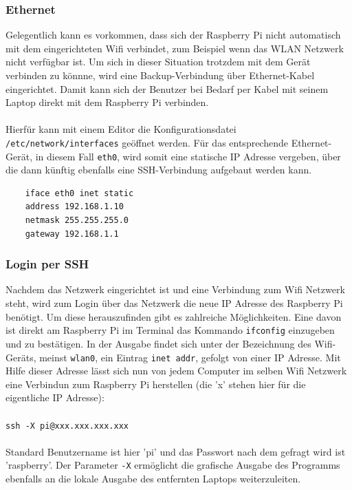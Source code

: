   \subsubsection{Ethernet}
    Gelegentlich kann es vorkommen, dass sich der Raspberry Pi nicht automatisch
    mit dem eingerichteten Wifi verbindet, zum Beispiel wenn das WLAN Netzwerk
    nicht verfügbar ist. Um sich in dieser Situation trotzdem mit dem Gerät
    verbinden zu könnne, wird eine Backup-Verbindung über Ethernet-Kabel
    eingerichtet. Damit kann sich der Benutzer bei Bedarf per Kabel mit seinem
    Laptop direkt mit dem Raspberry Pi verbinden. \\
    \ \\
    Hierfür kann mit einem Editor die Konfigurationsdatei
    \texttt{/etc/network/interfaces} geöffnet werden. Für das entsprechende
    Ethernet-Gerät, in diesem Fall \texttt{eth0}, wird somit eine statische IP
    Adresse vergeben, über die dann künftig ebenfalls eine SSH-Verbindung
    aufgebaut werden kann.

    \begin{lstlisting}
    iface eth0 inet static
    address 192.168.1.10
    netmask 255.255.255.0
    gateway 192.168.1.1
    \end{lstlisting}
    \vspace{0.5cm}

  \subsubsection{Login per SSH}
    Nachdem das Netzwerk eingerichtet ist und eine Verbindung zum Wifi Netzwerk
    steht, wird zum Login über das Netzwerk die neue IP Adresse des Raspberry Pi
    benötigt. Um diese herauszufinden gibt es zahlreiche Möglichkeiten. Eine
    davon ist direkt am Raspberry Pi im Terminal das Kommando \texttt{ifconfig}
    einzugeben und zu bestätigen. In der Ausgabe findet sich unter der
    Bezeichnung des Wifi-Geräts, meinst \texttt{wlan0}, ein Eintrag \texttt{inet
    addr}, gefolgt von einer IP Adresse. Mit Hilfe dieser Adresse lässt
    sich nun von jedem Computer im selben Wifi Netzwerk eine Verbindun zum
    Raspberry Pi herstellen (die 'x' stehen hier für die eigentliche IP Adresse): \\
    \ \\
    \texttt{ssh -X pi@xxx.xxx.xxx.xxx} \\
    \ \\
    Standard Benutzername ist hier 'pi' und das Passwort nach dem gefragt wird
    ist 'raspberry'. Der Parameter \texttt{-X} ermöglicht die grafische Ausgabe
    des Programms ebenfalls an die lokale Ausgabe des entfernten Laptops
    weiterzuleiten.\\


